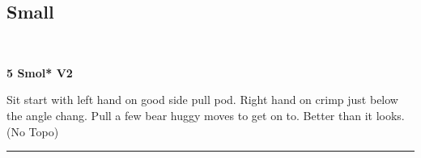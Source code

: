 \begin{multicols}{2}
			\subsection*{Small}\label{bf:Small}
			\begin{minipage}{\columnwidth}
			\
			\end{minipage}
			
					\begin{minipage}{\linewidth}	
					\label{rt:Smol}
\colorbox{green!20}{
\textbf{
5 Smol* V2   
}
}

					\begin{adjustwidth}{0.5cm}{}				
					Sit start with left hand on good side pull pod. Right hand on crimp just below the angle chang. Pull a few bear huggy moves to get on to. Better than it looks.
						\newline (No Topo) 
					\end{adjustwidth}
					\end{minipage}
\end{multicols}
\rule{\textwidth}{1pt}
